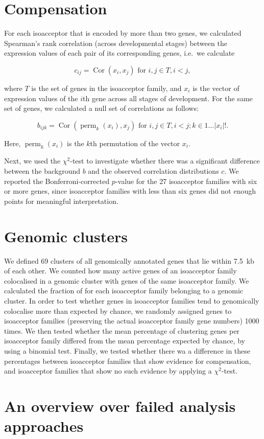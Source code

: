 \section{Compensation}

For each isoacceptor that is encoded by more than two \trna genes, we calculated
Spearman’s rank correlation (across developmental stages) between the expression
values of each pair of its corresponding \trna genes, i.e.\ we calculate

\begin{equation}
    c_{ij} = \operatorname{Cor}(x_i, x_j) \text{ for \(i, j \in T, i < j\)},
\end{equation}

where \(T\) is the set of \trna genes in the isoacceptor family, and \(x_i\) is
the vector of expression values of the \(i\)th \trna gene across all stages of
development. For the same set of genes, we calculated a null set of correlations
as follows:

\begin{equation}
    b_{ijk} = \operatorname{Cor}(\operatorname{perm}_k(x_i), x_j)
        \text{ for \(i, j \in T, i < j; k \in 1\dots\lvert x_i\rvert!\)}.
\end{equation}

Here, \(\operatorname{perm}_k(x_i)\) is the \(k\)th permutation of the vector
\(x_i\).

Next, we used the \(\chi^2\)-test to investigate whether there was a significant
difference between the background \(b\) and the observed correlation
distributions \(c\). We reported the Bonferroni-corrected \(p\)-value for the
\num{27} isoacceptor families with six or more genes, since isoacceptor families
with less than six genes did not enough points for meaningful interpretation.

\section{Genomic clusters}

We defined \num{69} clusters of all genomically annotated \trna genes that lie
within \SI{7.5}{kb} of each other. We counted how many active \trna genes of an
isoacceptor family colocalised in a genomic cluster with \trna genes of the same
isoacceptor family. We calculated the fraction of \trna for each isoacceptor
family belonging to a genomic cluster. In order to test whether genes in
isoacceptor families tend to genomically colocalise more than expected by
chance, we randomly assigned \trna genes to isoacceptor families (preserving the
actual isoacceptor family gene numbers) \num{1000} times. We then tested whether
the mean percentage of clustering \trna genes per isoacceptor family differed
from the mean percentage expected by chance, by using a binomial test. Finally,
we tested whether there wa a difference in these percentages between isoacceptor
families that show evidence for compensation, and isoacceptor families that show
no such evidence by applying a \(\chi^2\)-test.

\section{An overview over failed analysis approaches}
